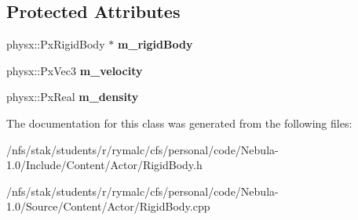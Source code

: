 \subsection*{Protected Attributes}
\begin{DoxyCompactItemize}
\item 
\hypertarget{classContent_1_1RigidBody_ab920782b0d3ae62b3fc6ea94a8395bb1}{
physx::PxRigidBody $\ast$ {\bfseries m\_\-rigidBody}}
\label{classContent_1_1RigidBody_ab920782b0d3ae62b3fc6ea94a8395bb1}

\item 
\hypertarget{classContent_1_1RigidBody_a6d792392ad3c8f373920e3e3f057828c}{
physx::PxVec3 {\bfseries m\_\-velocity}}
\label{classContent_1_1RigidBody_a6d792392ad3c8f373920e3e3f057828c}

\item 
\hypertarget{classContent_1_1RigidBody_a6853ad5c1f9dff8dd1c7f67fdab497d0}{
physx::PxReal {\bfseries m\_\-density}}
\label{classContent_1_1RigidBody_a6853ad5c1f9dff8dd1c7f67fdab497d0}

\end{DoxyCompactItemize}


The documentation for this class was generated from the following files:\begin{DoxyCompactItemize}
\item 
/nfs/stak/students/r/rymalc/cfs/personal/code/Nebula-\/1.0/Include/Content/Actor/RigidBody.h\item 
/nfs/stak/students/r/rymalc/cfs/personal/code/Nebula-\/1.0/Source/Content/Actor/RigidBody.cpp\end{DoxyCompactItemize}

